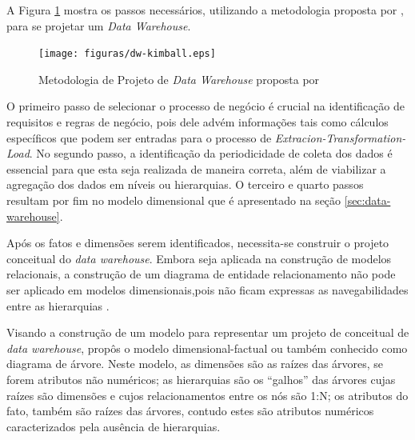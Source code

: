 {A Figura \ref{fig:metodologia-dw} mostra os passos necessários, utilizando a metodologia proposta por , para se projetar um \textit{Data Warehouse}.

\begin{figure}[ht!]
\centering
\texttt{[image: figuras/dw-kimball.eps]}
\caption{Metodologia de Projeto de \textit{Data Warehouse} proposta por }
\label{fig:metodologia-dw}
\end{figure}
\FloatBarrier

O primeiro passo de selecionar o processo de negócio é crucial na identificação de requisitos e regras de negócio, pois dele advém informações tais como cálculos específicos que podem ser entradas para o processo de \textit{Extracion-Transformation-Load}. No segundo passo, a identificação da periodicidade de coleta dos dados é essencial para que esta seja realizada de maneira correta, além de viabilizar a agregação dos dados em níveis ou hierarquias. O terceiro e quarto passos resultam por fim no modelo dimensional que é apresentado na seção \ref{sec:data-warehouse}. 

Após os fatos e dimensões serem identificados, necessita-se construir o projeto conceitual do \textit{data warehouse}. Embora seja aplicada na construção de modelos relacionais, a construção de um diagrama de entidade relacionamento não pode ser aplicado em modelos dimensionais,pois não ficam expressas as navegabilidades entre as hierarquias \cite{Golfarelli1998}.

Visando a construção de um modelo para representar um projeto de conceitual de \textit{data warehouse},  propôs o modelo dimensional-factual ou também conhecido como diagrama de árvore. Neste modelo, as dimensões são as raízes das árvores, se forem atributos não numéricos; as hierarquias são os “galhos” das árvores cujas raízes são dimensões e cujos relacionamentos entre os nós são 1:N; os atributos do fato, também são raízes das árvores, contudo estes são atributos numéricos caracterizados pela ausência de hierarquias.


}
